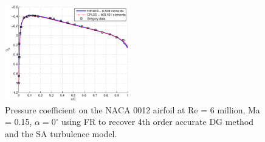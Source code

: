 \begin{figure}
\centering
  \includegraphics[width=0.48\textwidth]{cp.eps}
  \caption{Pressure coefficient on the NACA 0012 airfoil at Re = 6 million, Ma = 0.15, $\alpha = 0^{\circ}$ using FR to recover 4th order accurate DG method and the SA turbulence model.}
  \label{RANS_naca0012_cp}
\end{figure}

